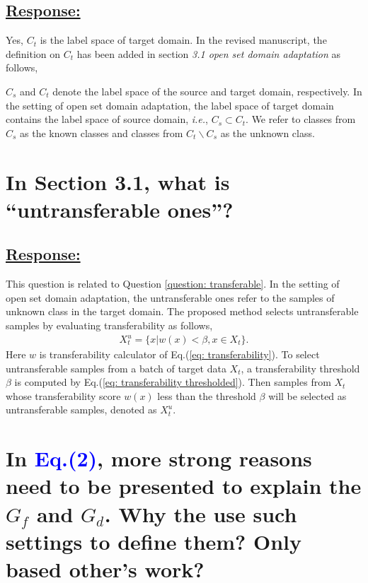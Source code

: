 \subsection*{\underline{\textbf{Response:}}}
Yes, $C_t$ is the label space of target domain.
In the revised manuscript, the definition on $C_t$ has been added in section \textit{3.1 open set domain adaptation} as follows,
\begin{siderules}
\small
$C_s$ and $C_t$ denote the label space of the source and target domain, respectively.
In the setting of open set domain adaptation, the label space of target domain contains the label space of source domain, \textit{i.e.}, $C_s \subset C_t$.
We refer to classes from $C_s$ as the known classes and classes from $C_t\backslash C_s$ as the unknown class.
\end{siderules}


\section{In Section 3.1, what is ``untransferable ones''?}
\subsection*{\underline{\textbf{Response:}}}

This question is related to Question \ref{question: transferable}.
In the setting of open set domain adaptation, the untransferable ones refer to the samples of unknown class in the target domain.
The proposed method selects untransferable samples by evaluating transferability as follows,
\begin{equation}
    \label{eq: split target examples untrnasferable}
    \begin{split}
        X_t^u=\{x|w(x) < \beta, x \in X_t \}.
    \end{split}
\end{equation}
Here $w$ is transferability calculator of Eq.(\ref{eq: transferability}).
To select untransferable samples from a batch of target data $X_t$, a transferability threshold $\beta$ is computed by Eq.(\ref{eq: transferability thresholded}).
Then samples from $X_t$ whose transferability score $w(x)$ less than the threshold $\beta$ will be selected as untransferable samples, denoted as $X_t^u$.

\section{In \textcolor{blue}{Eq.(2)}, more strong reasons need to be presented to explain the $G_f$ and $G_d$. Why the use such settings to define them? Only based other's work?}
